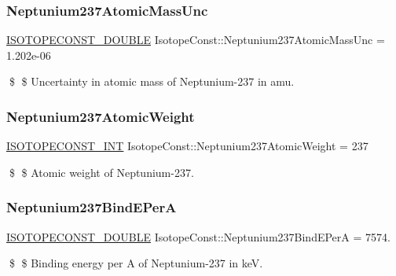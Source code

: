 \subsubsection{\texorpdfstring{Neptunium237\+Atomic\+Mass\+Unc}{Neptunium237AtomicMassUnc}}
{\footnotesize\ttfamily \mbox{\hyperlink{group___isotope_const-_macros_ga8f45a7272ce02c0b4c65c44636ed719a}{I\+S\+O\+T\+O\+P\+E\+C\+O\+N\+S\+T\+\_\+\+D\+O\+U\+B\+LE}} Isotope\+Const\+::\+Neptunium237\+Atomic\+Mass\+Unc = 1.\+202e-\/06}

\$ \$ Uncertainty in atomic mass of Neptunium-\/237 in amu. \mbox{\label{group___isotope_const-_neptunium-_np237_ga3639920fdcd6907eb02e7d893133495f}} 
\subsubsection{\texorpdfstring{Neptunium237\+Atomic\+Weight}{Neptunium237AtomicWeight}}
{\footnotesize\ttfamily \mbox{\hyperlink{group___isotope_const-_macros_ga5f18360b3e99483a35c32d789e62621c}{I\+S\+O\+T\+O\+P\+E\+C\+O\+N\+S\+T\+\_\+\+I\+NT}} Isotope\+Const\+::\+Neptunium237\+Atomic\+Weight = 237}

\$ \$ Atomic weight of Neptunium-\/237. \mbox{\label{group___isotope_const-_neptunium-_np237_ga440cbe54c626033e032d52f294732f6b}} 
\subsubsection{\texorpdfstring{Neptunium237\+Bind\+E\+PerA}{Neptunium237BindEPerA}}
{\footnotesize\ttfamily \mbox{\hyperlink{group___isotope_const-_macros_ga8f45a7272ce02c0b4c65c44636ed719a}{I\+S\+O\+T\+O\+P\+E\+C\+O\+N\+S\+T\+\_\+\+D\+O\+U\+B\+LE}} Isotope\+Const\+::\+Neptunium237\+Bind\+E\+PerA = 7574.}

\$ \$ Binding energy per A of Neptunium-\/237 in keV. \mbox{\label{group___isotope_const-_neptunium-_np237_ga7f0a543aaeb4be99b4aa97d4f34c1b6d}} 
